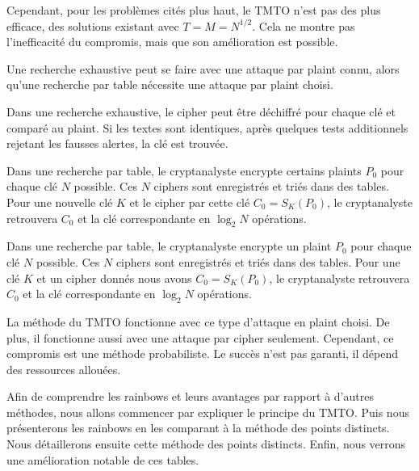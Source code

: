 		\bigskip

		Cependant, pour les problèmes cités plus haut, le \gls{TMTO} n'est pas des plus efficace, des solutions existant avec $T = M = N^{1/2}$. Cela ne montre pas l'inefficacité du compromis, mais que son amélioration est possible.

		\bigskip

		Une recherche exhaustive peut se faire avec une attaque par \gls{plaint} connu, alors qu'une recherche par table nécessite une attaque par \gls{plaint} choisi.

		\bigskip

		Dans une recherche exhaustive, le \gls{cipher} peut être déchiffré pour chaque clé et comparé au \gls{plaint}. Si les textes sont identiques, après quelques tests additionnels rejetant les fausses alertes, la clé est trouvée.

		\bigskip

		Dans une recherche par table, le cryptanalyste encrypte certains \glspl{plaint} $P_0$ pour chaque clé $N$ possible. Ces $N$ \glspl{cipher} sont enregistrés et triés dans des tables. Pour une nouvelle clé $K$ et le \gls{cipher} par cette clé $C_0 = S_K(P_0)$, le cryptanalyste retrouvera $C_0$ et la clé correspondante en $\log_2 N$ opérations.

		Dans une recherche par table, le cryptanalyste encrypte un \gls{plaint} $P_0$ pour chaque clé $N$ possible. Ces $N$ \glspl{cipher} sont enregistrés et triés dans des tables. Pour une clé $K$ et un \gls{cipher} donnés nous avons $C_0 = S_K(P_0)$, le cryptanalyste retrouvera $C_0$ et la clé correspondante en $\log_2 N$ opérations.
		\bigskip

		La méthode du \gls{TMTO} fonctionne avec ce type d'attaque en \gls{plaint} choisi. De plus, il fonctionne aussi avec une attaque par \gls{cipher} seulement. Cependant, ce compromis est une méthode probabiliste. Le succès n'est pas garanti, il dépend des ressources allouées.

		\bigskip

		Afin de comprendre les \glspl{rainbow} et leurs avantages par rapport à d'autres méthodes, nous allons commencer par expliquer le principe du \gls{TMTO}. Puis nous présenterons les \glspl{rainbow} en les comparant à la méthode des points distincts. Nous détaillerons ensuite cette méthode des points distincts. Enfin, nous verrons une amélioration notable de ces tables.

\endinput{}
